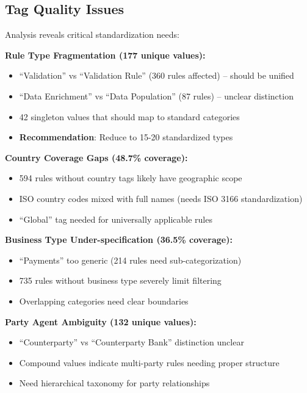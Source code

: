 \subsection{Tag Quality Issues}

Analysis reveals critical standardization needs:

\textbf{Rule Type Fragmentation (177 unique values):}
\begin{itemize}[leftmargin=*,itemsep=2pt,topsep=2pt]
 \item ``Validation'' vs ``Validation Rule'' (360 rules affected) -- should be unified
 \item ``Data Enrichment'' vs ``Data Population'' (87 rules) -- unclear distinction
 \item 42 singleton values that should map to standard categories
 \item \textbf{Recommendation}: Reduce to 15-20 standardized types
\end{itemize}

\textbf{Country Coverage Gaps (48.7\% coverage):}
\begin{itemize}[leftmargin=*,itemsep=2pt,topsep=2pt]
 \item 594 rules without country tags likely have geographic scope
 \item ISO country codes mixed with full names (needs ISO 3166 standardization)
 \item ``Global'' tag needed for universally applicable rules
\end{itemize}

\textbf{Business Type Under-specification (36.5\% coverage):}
\begin{itemize}[leftmargin=*,itemsep=2pt,topsep=2pt]
 \item ``Payments'' too generic (214 rules need sub-categorization)
 \item 735 rules without business type severely limit filtering
 \item Overlapping categories need clear boundaries
\end{itemize}

\textbf{Party Agent Ambiguity (132 unique values):}
\begin{itemize}[leftmargin=*,itemsep=2pt,topsep=2pt]
 \item ``Counterparty'' vs ``Counterparty Bank'' distinction unclear
 \item Compound values indicate multi-party rules needing proper structure
 \item Need hierarchical taxonomy for party relationships
\end{itemize}


